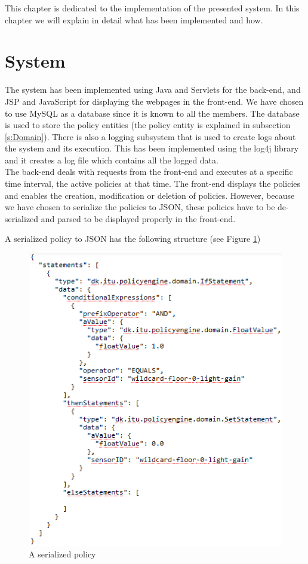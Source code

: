 This chapter is dedicated to the implementation of the presented system. In this chapter we will explain in detail what has been implemented and how. 

\section{System}
The system has been implemented using Java and Servlets for the back-end, and JSP and JavaScript for displaying the webpages in the front-end. We have chosen to use MySQL as a database since it is known to all the members. The database is used to store the policy entities (the policy entity is explained in subsection \ref{s:Domain}). There is also a logging subsystem that is used to create logs about the system and its execution. This has been implemented using the log4j library and it creates a log file which contains all the logged data. 
\\The back-end deals with requests from the front-end and executes at a specific time interval, the active policies at that time. The front-end displays the policies and enables the creation, modification or deletion of policies. However, because we have chosen to serialize the policies to JSON, these policies have to be de-serialized and parsed to be displayed properly in the front-end. 

A serialized policy to JSON has the following structure (see Figure \ref{fig:json_policy})

\begin{figure}[ht]
	\centering
    \includegraphics[scale=0.85]{images/json_policy.png} 
	\caption{A serialized policy}
	\label{fig:json_policy}
\end{figure}

